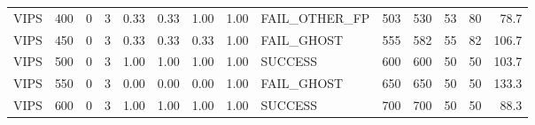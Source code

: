 \begin{tabular}{lrrr|rrrr|lrr|rr|r}
  VIPS                           &  400 &    0 &   3 & 0.33 & 0.33 & 1.00 & 1.00 & FAIL_OTHER_FP   &   503 &   530 &    53 &    80 &  78.7 \\
  VIPS                           &  450 &    0 &   3 & 0.33 & 0.33 & 0.33 & 1.00 & FAIL_GHOST      &   555 &   582 &    55 &    82 & 106.7 \\
  VIPS                           &  500 &    0 &   3 & 1.00 & 1.00 & 1.00 & 1.00 & SUCCESS         &   600 &   600 &    50 &    50 & 103.7 \\
  VIPS                           &  550 &    0 &   3 & 0.00 & 0.00 & 0.00 & 1.00 & FAIL_GHOST      &   650 &   650 &    50 &    50 & 133.3 \\
  VIPS                           &  600 &    0 &   3 & 1.00 & 1.00 & 1.00 & 1.00 & SUCCESS         &   700 &   700 &    50 &    50 &  88.3 \\
\end{tabular}
